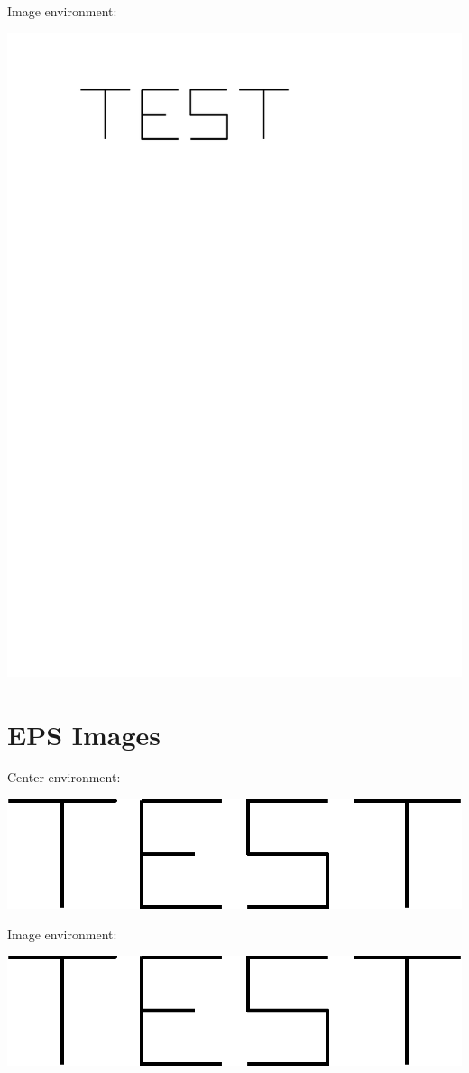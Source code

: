 \documentclass{ximera}
\begin{document}
Image environment:

\begin{image}
\includegraphics{TestImagePDF}
\end{image}



\section{EPS Images}

Center environment:

\begin{center}
\includegraphics{TestImageEPS}
\end{center}

Image environment:

\begin{image}
\includegraphics{TestImageEPS}
\end{image}
\end{document}
